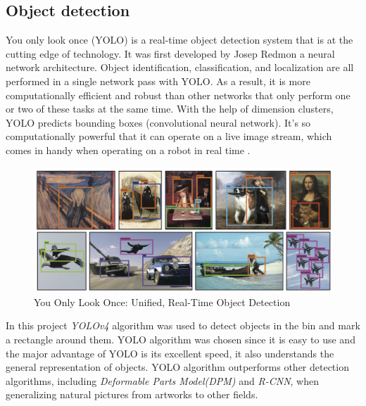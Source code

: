 \subsection{Object detection}


You only look once (YOLO) is a real-time object detection system that is at the cutting edge of technology. 
It was first developed by Josep Redmon a neural network architecture.
Object identification, classification, and localization are all performed in a single network pass with YOLO. 
As a result, it is more computationally efficient and robust than other networks that only perform one or two of these tasks at the same time. 
With the help of dimension clusters, YOLO predicts bounding boxes (convolutional neural network). 
It's so computationally powerful that it can operate on a live image stream, which comes in handy when operating on a robot in real time \cite{redmon_yolov3_2018}.
\begin{figure} [ht]
    \centering
    \includegraphics[width = 0.75 \textwidth]{graphics/yolo.PNG}
    \caption{You Only Look Once: Unified, Real-Time Object Detection \cite{redmon_you_2016}}
    \label{fig:yolo}
\end{figure}


In this project \textit{YOLOv4}\cite{bochkovskiy_yolov4_2020} algorithm was used to detect objects in the bin and mark a rectangle around them. 
YOLO algorithm was chosen since it is easy to use and the major advantage of YOLO is its excellent speed, it also understands the general representation of objects. YOLO algorithm outperforms other detection algorithms, including \textit{Deformable Parts Model(DPM)} and \textit{R-CNN}, when generalizing natural pictures from artworks to other fields.



